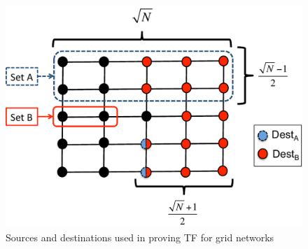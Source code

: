 \begin{figure}
\begin{centering}
    \includegraphics[scale=0.39]{figures/TF_proof_fig_color.pdf}
    \vspace{-4mm}
    \caption{Sources and destinations used in proving TF for grid networks}
    \label{fig:TF_proof_fig}
    \vspace{-6mm}
\end{centering}
\end{figure}

